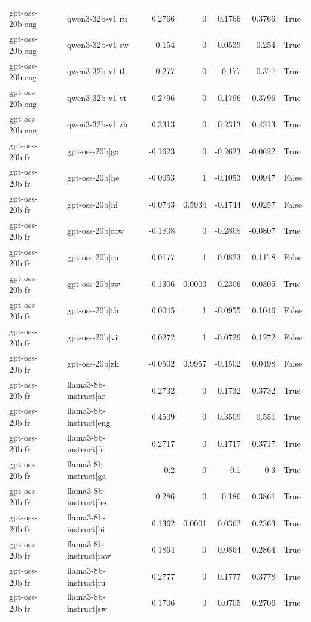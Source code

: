 \begin{table}
\begin{tabular}{l l r r r r l}
gpt-oss-20b|eng & qwen3-32b-v1|ru & 0.2766 & 0 & 0.1766 & 0.3766 & True \\
gpt-oss-20b|eng & qwen3-32b-v1|sw & 0.154 & 0 & 0.0539 & 0.254 & True \\
gpt-oss-20b|eng & qwen3-32b-v1|th & 0.277 & 0 & 0.177 & 0.377 & True \\
gpt-oss-20b|eng & qwen3-32b-v1|vi & 0.2796 & 0 & 0.1796 & 0.3796 & True \\
gpt-oss-20b|eng & qwen3-32b-v1|zh & 0.3313 & 0 & 0.2313 & 0.4313 & True \\
gpt-oss-20b|fr & gpt-oss-20b|ga & -0.1623 & 0 & -0.2623 & -0.0622 & True \\
gpt-oss-20b|fr & gpt-oss-20b|he & -0.0053 & 1 & -0.1053 & 0.0947 & False \\
gpt-oss-20b|fr & gpt-oss-20b|hi & -0.0743 & 0.5934 & -0.1744 & 0.0257 & False \\
gpt-oss-20b|fr & gpt-oss-20b|raw & -0.1808 & 0 & -0.2808 & -0.0807 & True \\
gpt-oss-20b|fr & gpt-oss-20b|ru & 0.0177 & 1 & -0.0823 & 0.1178 & False \\
gpt-oss-20b|fr & gpt-oss-20b|sw & -0.1306 & 0.0003 & -0.2306 & -0.0305 & True \\
gpt-oss-20b|fr & gpt-oss-20b|th & 0.0045 & 1 & -0.0955 & 0.1046 & False \\
gpt-oss-20b|fr & gpt-oss-20b|vi & 0.0272 & 1 & -0.0729 & 0.1272 & False \\
gpt-oss-20b|fr & gpt-oss-20b|zh & -0.0502 & 0.9957 & -0.1502 & 0.0498 & False \\
gpt-oss-20b|fr & llama3-8b-instruct|ar & 0.2732 & 0 & 0.1732 & 0.3732 & True \\
gpt-oss-20b|fr & llama3-8b-instruct|eng & 0.4509 & 0 & 0.3509 & 0.551 & True \\
gpt-oss-20b|fr & llama3-8b-instruct|fr & 0.2717 & 0 & 0.1717 & 0.3717 & True \\
gpt-oss-20b|fr & llama3-8b-instruct|ga & 0.2 & 0 & 0.1 & 0.3 & True \\
gpt-oss-20b|fr & llama3-8b-instruct|he & 0.286 & 0 & 0.186 & 0.3861 & True \\
gpt-oss-20b|fr & llama3-8b-instruct|hi & 0.1362 & 0.0001 & 0.0362 & 0.2363 & True \\
gpt-oss-20b|fr & llama3-8b-instruct|raw & 0.1864 & 0 & 0.0864 & 0.2864 & True \\
gpt-oss-20b|fr & llama3-8b-instruct|ru & 0.2777 & 0 & 0.1777 & 0.3778 & True \\
gpt-oss-20b|fr & llama3-8b-instruct|sw & 0.1706 & 0 & 0.0705 & 0.2706 & True \\

\end{tabular}
\end{table}
